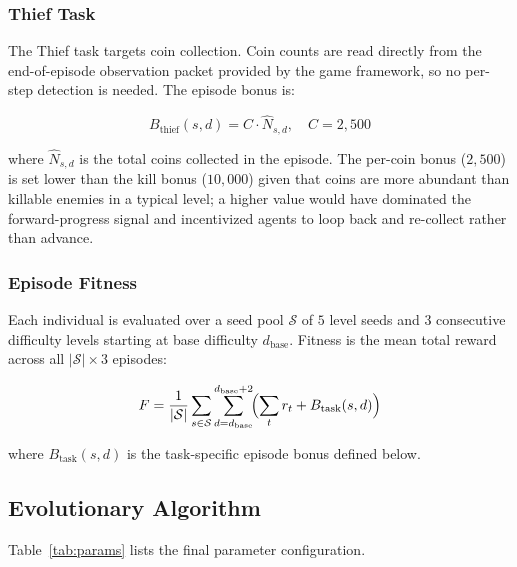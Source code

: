 \documentclass[runningheads]{llncs}
\begin{document}
\subsubsection{Thief Task}

The Thief task targets coin collection. Coin counts are read directly from the end-of-episode observation packet provided by the game framework, so no per-step detection is needed. The episode bonus is:

\begin{equation}
B_{\text{thief}}(s,d) = C \cdot \hat{N}_{s,d}, \quad C = 2{,}500
\end{equation}

where $\hat{N}_{s,d}$ is the total coins collected in the episode. The per-coin bonus ($2{,}500$) is set lower than the kill bonus ($10{,}000$) given that coins are more abundant than killable enemies in a typical level; a higher value would have dominated the forward-progress signal and incentivized agents to loop back and re-collect rather than advance.

\subsubsection{Episode Fitness}

Each individual is evaluated over a seed pool $\mathcal{S}$ of $5$ level seeds and $3$ consecutive difficulty levels starting at base difficulty $d_{\text{base}}$. Fitness is the mean total reward across all $|\mathcal{S}| \times 3$ episodes:

\begin{equation}
F = \frac{1}{|\mathcal{S}|} \sum_{s \in \mathcal{S}} \sum_{d=d_{\text{base}}}^{d_{\text{base}}+2} \!\Bigl(\sum_t r_t + B_{\text{task}}(s, d)\Bigr)
\label{eq:fitness}
\end{equation}

where $B_{\text{task}}(s, d)$ is the task-specific episode bonus defined below.

\subsection{Evolutionary Algorithm}
\label{sec:ea}

Table~\ref{tab:params} lists the final parameter configuration.
\end{document}
